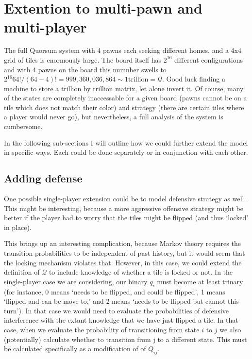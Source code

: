 \documentclass[letterpaper,11pt]{article}
\begin{document}
\section{Extention to multi-pawn and multi-player}
The full Quorsum system with 4 pawns each seeking different homes, and a 4x4
grid of tiles is enormously large.  The board itself has $2^{16}$ different
configurations and with 4 pawns on the board this numnber swells to 
$2^{16} 64!/(64-4)! = 999,360,036,864 \sim \mathrm{1 trillion}=\mathcal{Q}$.
Good luck finding a machine to store a trillion by trillion matrix, let alone
invert it.  Of course, many of the states are completely inaccessable for a
given board (pawns cannot be on a tile which does not match their color)
and strategy (there are certain tiles where a player would never go), but
nevertheless, a full analysis of the system is cumbersome.

In the following sub-sections I will outline how we could further extend the
model in specific ways.  Each could be done separately or in conjunction with
each other. 

\subsection{Adding defense}
One possible single-player extension could be to model defensive strategy as
well.  This might be interesting, because a more aggressive offensive strategy
might be better if the player had to worry that the tiles might be flipped (and
thus `locked' in place).

This brings up an interesting complication, because Markov theory requires the
transition probabilities to be independent of past history, but it would seem
that the locking mechanism violates that.  However, in this case, we could
extend the definition of $\mathcal{Q}$ to include knowledge of whether a tile
is locked or not.  In the single-player case we are considering, our binary 
$q_i$ must become at least trinary (for instance, 0 means `needs to be flipped,
and could be flipped', 1 means `flipped and can be move to,'
and 2 means `needs to be flipped but cannot this turn').  In that case we
would need to evaluate the probabilities of defensive interference with the
extant knowledge that we have just flipped a tile.  In that case, when we
evaluate the probability of transitioning from state $i$ to $j$ we also 
(potentially) calculate whether to transition from j to a different state.
This must be calculated specifically as a modification of of $Q_{ij}$.
\end{document}
